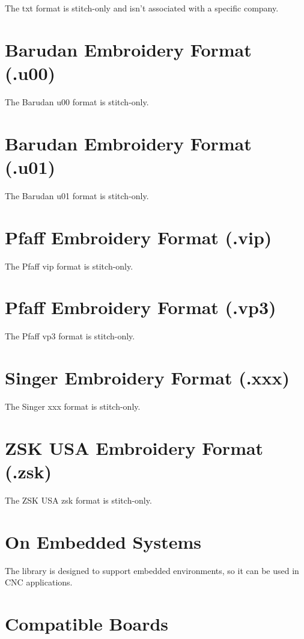 \documentclass{report}
\begin{document}
The txt format is stitch-only and isn't associated with a specific company.

\section{Barudan Embroidery Format (.u00)}

The Barudan u00 format is stitch-only.

\section{Barudan Embroidery Format (.u01)}

The Barudan u01 format is stitch-only.

\section{Pfaff Embroidery Format (.vip)}

The Pfaff vip format is stitch-only.

\section{Pfaff Embroidery Format (.vp3)}

The Pfaff vp3 format is stitch-only.

\section{Singer Embroidery Format (.xxx)}

The Singer xxx format is stitch-only.

\section{ZSK USA Embroidery Format (.zsk)}

The ZSK USA zsk format is stitch-only.
  
\section{On Embedded Systems}

The library is designed to support embedded environments, so it can
be used in CNC applications.

\section{Compatible Boards}
\end{document}
